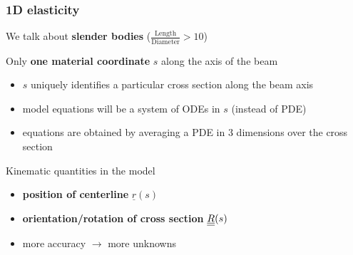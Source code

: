 \begin{frame}
  \frametitle{1D elasticity}
  
  We talk about \textbf{slender bodies} ($\frac{\mathrm{Length}}{\mathrm{Diameter}} > 10$)
  \vspace{1em}
  
  Only \textbf{one material coordinate} $s$ along the axis of the beam
  \begin{itemize}
    \item $s$ uniquely identifies a particular cross section along the beam axis
    \item model equations will be a system of ODEs in $s$ (instead of PDE)
    \item equations are obtained by averaging a PDE in 3 dimensions over the cross section
  \end{itemize}
  \vspace{1em}
  
  Kinematic quantities in the model
  \begin{itemize}
    \item \textbf{position of centerline} $\underline{r}(s)$
    \item \textbf{orientation/rotation of cross section} $\underline{\underline{R}}(s)$
    \item more accuracy $\rightarrow$ more unknowns
  \end{itemize}
  
\end{frame}
